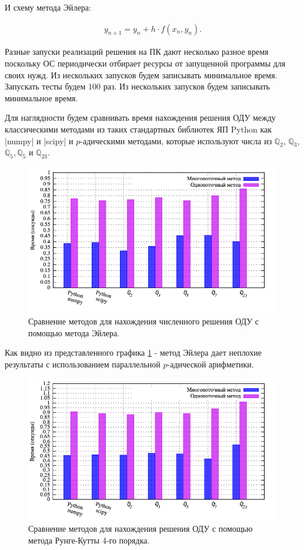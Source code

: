 \documentclass[master, och, diploma, times]{sty/SCWorks}
\theoremstyle{plain}
\theoremstyle{definition}
\numberwithin{equation}{section}
\begin{document}
\noindent И схему метода Эйлера:

\begin{equation}%
\begin{aligned}
y_{n+1}=y_n+h \cdot f(x_n, y_n).
\end{aligned}
\end{equation}


Разные запуски реализаций решения на ПК дают несколько разное время поскольку ОС периодически отбирает ресурсы от запущенной программы для своих нужд. Из нескольких запусков будем записывать минимальное время. Запускать тесты будем $100$ раз. Из нескольких запусков будем записывать минимальное время.

Для наглядности будем сравнивать время нахождения решения ОДУ между классическими методами из таких стандартных библиотек ЯП Python как |numpy| и |scipy| и $p$-адическими методами, которые используют числа из $\mathbb{Q}_2$, $\mathbb{Q}_3$, $\mathbb{Q}_5, \mathbb{Q}_5$ и $\mathbb{Q}_{23}$.

\begin{figure}[H]
\centerline{\includegraphics[width=0.85\linewidth]{../gnuplot/multi/euler/plot.png}}
\caption{Сравнение методов для нахождения численного решения ОДУ с помощью метода Эйлера.}
\label{img:multi:ode:euler}
\end{figure}


Как видно из представленного графика \ref{img:multi:ode:euler} - метод Эйлера дает неплохие результаты с использованием параллельной $p$-адической арифметики.


\begin{figure}[H]
\centerline{\includegraphics[width=0.85\linewidth]{../gnuplot/multi/rk/plot.png}}
\caption{Сравнение методов для нахождения решения ОДУ с помощью метода Рунге-Кутты 4-го порядка.}
\label{img:comp:ode:rk}
\end{figure}
\end{document}
